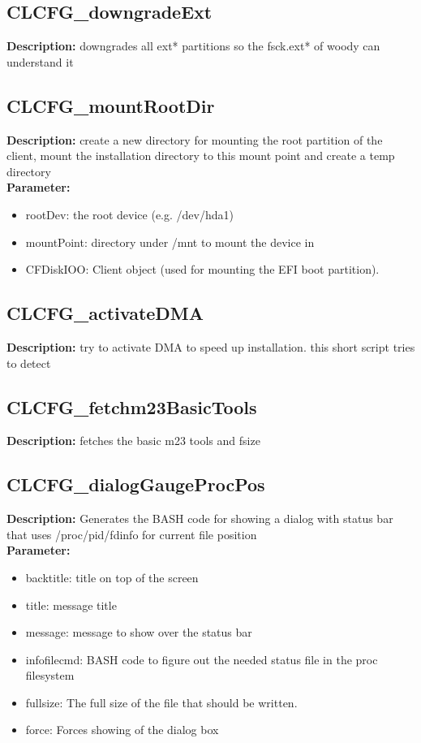 \subsection{CLCFG\_downgradeExt}
\textbf{Description:} downgrades all ext* partitions so the fsck.ext* of woody can understand it\\

\subsection{CLCFG\_mountRootDir}
\textbf{Description:} create a new directory for mounting the root partition of the client, mount the installation directory to this mount point and create a temp directory\\
\textbf{Parameter:}
\begin{itemize}
\item rootDev: the root device (e.g. /dev/hda1)
\item mountPoint: directory under /mnt to mount the device in
\item CFDiskIOO: Client object (used for mounting the EFI boot partition).
\end{itemize}

\subsection{CLCFG\_activateDMA}
\textbf{Description:} try to activate DMA to speed up installation. this short script tries to detect\\

\subsection{CLCFG\_fetchm23BasicTools}
\textbf{Description:} fetches the basic m23 tools and fsize\\

\subsection{CLCFG\_dialogGaugeProcPos}
\textbf{Description:} Generates the BASH code for showing a dialog with status bar that uses /proc/pid/fdinfo for current file position\\
\textbf{Parameter:}
\begin{itemize}
\item backtitle: title on top of the screen
\item title: message title
\item message: message to show over the status bar
\item infofilecmd: BASH code to figure out the needed status file in the proc filesystem
\item fullsize: The full size of the file that should be written.
\item force: Forces showing of the dialog box
\end{itemize}

